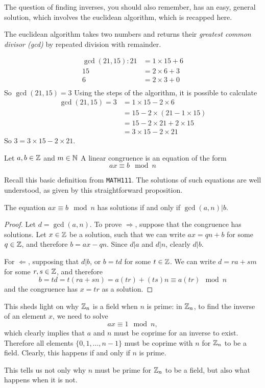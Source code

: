 The question of finding inverses, you should also remember, has an easy, general solution, which involves the euclidean algorithm, which is recapped here.
\begin{definition}
	The euclidean algorithm takes two numbers and returns their \emph{greatest common divisor (gcd)} by repeated division with remainder.
\end{definition}
\begin{align*}
	\gcd(21,15):21 &= 1\times15 + 6\\
	15 &= 2\times6 + 3\\
	6 &= 2\times3 + 0\\
\end{align*}
So $\gcd(21,15)=3$
Using the steps of the algorithm, it is possible to calculate
\begin{align*}
	\gcd(21,15) = 3 &= 1\times15 - 2\times6\\
	&= 15 - 2\times(21 - 1\times15)\\
	&= 15 - 2\times21 + 2\times15\\
	&=3\times15 - 2\times21
\end{align*}
So $3 = 3\times15 - 2\times21$. %
\begin{definition}
	Let $a,b \in \mathbb{Z}$ and $m \in \mathbb{N}$ A linear congruence is an equation of the form
	$$ax \equiv b \mod n$$
\end{definition}
Recall this basic definition from \texttt{MATH111}. The solutions of such equations are well understood, as given by this straightforward proposition.
\begin{proposition}
	The equation $ax \equiv b \mod n$ has solutions if and only if $\gcd(a,n)|b$.
\end{proposition}
\begin{proof}
	Let $d = \gcd(a,n)$. To prove $\Rightarrow$, suppose that the congruence has solutions. Let $x \in \mathbb{Z}$ be a solution, such that we can write $ax = qn + b$ for some $q \in \mathbb{Z}$, and therefore $b = ax - qn$. Since $d|a$ and $d|n$, clearly $d|b$.

	For  $\Leftarrow$, supposing that $d|b$, or $b=td$ for some $t \in \mathbb{Z}$. We can write $d = ra + sm$ for some $r,s \in \mathbb{Z}$, and therefore
	$$b = td = t(ra + sn) = a(tr) + (ts)n \equiv a(tr) \mod n$$
	and the congruence has $x = tr$ as a solution.
\end{proof}
This sheds light on why $\mathbb{Z}_{n}$ is a field when $n$ is prime: in $\mathbb{Z}_{n}$, to find the inverse of an element $x$, we need to solve
$$ax \equiv 1 \mod n,$$
which clearly implies that $a$ and $n$ must be coprime for an inverse to exist. Therefore all elements $\{0,1,\ldots,n-1\}$ must be coprime with $n$ for $\mathbb{Z}_{n}$ to be a field. Clearly, this happens if and only if $n$ is prime.

This tells us not only why $n$ must be prime for $\mathbb{Z}_{n}$ to be a field, but also what happens when it is not.
